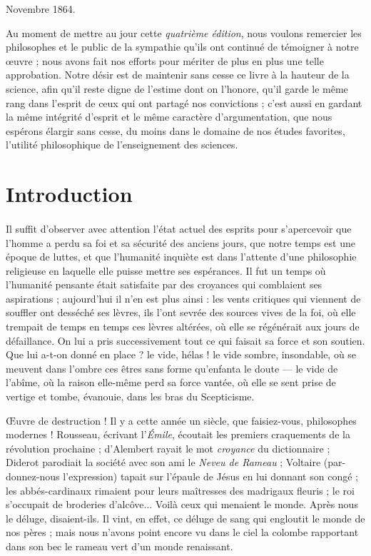 \documentclass[a4paper, 11pt, oneside, landscape]{article}
\begin{document}
Novembre 1864.

\bigskip

Au moment de mettre au jour cette \emph{quatrième édition}, nous voulons remercier les philosophes et le public de la sympathie qu'ils ont continué de témoigner à notre œuvre ; nous avons fait nos efforts pour mériter de plus en plus une telle approbation. Notre désir est de maintenir sans cesse ce livre à la hauteur de la science, afin qu'il reste digne de l'estime dont on l'honore, qu'il garde le même rang dans l'esprit de ceux qui ont partagé nos convictions ; c'est aussi en gardant la même intégrité d'esprit et le même caractère d'argumentation, que nous espérons élargir sans cesse, du moins dans le domaine de nos études favorites, l'utilité philosophique de l'enseignement des sciences.
\clearpage
\section*{Introduction}
\paragraph{}
Il suffit d'observer avec attention l'état actuel des esprits pour s'apercevoir que l'homme a perdu sa foi et sa sécurité des anciens jours, que notre temps est une époque de luttes, et que l'humanité inquiète est dans l'attente d'une philosophie religieuse en laquelle elle puisse mettre ses espérances. Il fut un temps où l'humanité pensante était satisfaite par des croyances qui comblaient ses aspirations ; aujourd'hui il n'en est plus ainsi : les vents critiques qui viennent de souffler ont desséché ses lèvres, ils l'ont sevrée des sources vives de la foi, où elle trempait de temps en temps ces lèvres altérées, où elle se régénérait aux jours de défaillance. On lui a pris successivement tout ce qui faisait sa force et son soutien. Que lui a-t-on donné en place ? le vide, hélas ! le vide sombre, insondable, où se meuvent dans l'ombre ces êtres sans forme qu'enfanta le doute --- le vide de l'abîme, où la raison elle-même perd sa force vantée, où elle se sent prise de vertige et tombe, évanouie, dans les bras du Scepticisme.

Œuvre de destruction ! Il y a cette année un siècle, que faisiez-vous, philosophes modernes ! Rousseau, écrivant l'\emph{Émile}, écoutait les premiers craquements de la révolution prochaine ; d'Alembert rayait le mot \emph{croyance} du dictionnaire ; Diderot parodiait la société avec son ami le \emph{Neveu de Rameau} ; Voltaire (par-donnez-nous l'expression) tapait sur l'épaule de Jésus en lui donnant son congé ; les abbés-cardinaux rimaient pour leurs maîtresses des madrigaux fleuris ; le roi s'occupait de broderies d'alcôve... Voilà ceux qui menaient le monde. Après nous le déluge, disaient-ils. Il vint, en effet, ce déluge de sang qui engloutit le monde de nos pères ; mais nous n'avons point encore vu dans le ciel la colombe rapportant dans son bec le rameau vert d'un monde renaissant.
\end{document}
